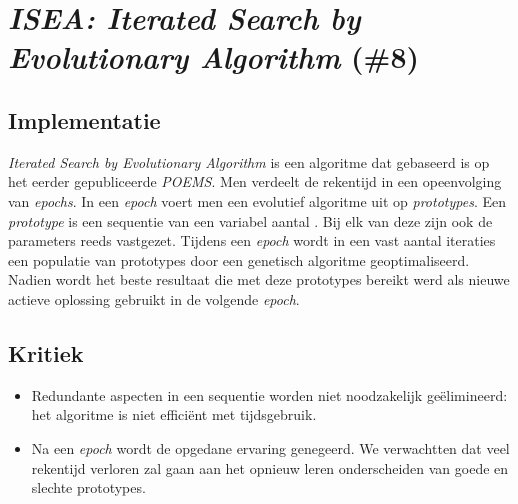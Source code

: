 \section{\emph{ISEA: Iterated Search by Evolutionary Algorithm} (\#8)}

\subsection{Implementatie}
\emph{Iterated Search by Evolutionary Algorithm}\cite{chesc-isea} is een algoritme dat gebaseerd is op het eerder gepubliceerde \emph{POEMS}\cite{eurogp06:KubalikFaigl}. Men verdeelt de rekentijd in een opeenvolging van \emph{epochs}. In een \emph{epoch} voert men een evolutief algoritme uit op \emph{prototypes}. Een \emph{prototype} is een sequentie van een variabel aantal \abhn{}. Bij elk van deze \abhn{} zijn ook de parameters reeds vastgezet. Tijdens een \emph{epoch} wordt in een vast aantal iteraties een populatie van prototypes door een genetisch algoritme geoptimaliseerd. Nadien wordt het beste resultaat die met deze prototypes bereikt werd als nieuwe actieve oplossing gebruikt in de volgende \emph{epoch}. 

\subsection{Kritiek}
\begin{itemize}
 \item Redundante aspecten in een sequentie worden niet noodzakelijk ge\"elimineerd: het algoritme is niet effici\"ent met tijdsgebruik.
 \item Na een \emph{epoch} wordt de opgedane ervaring genegeerd. We verwachtten dat veel rekentijd verloren zal gaan aan het opnieuw leren onderscheiden van goede en slechte prototypes.
\end{itemize}